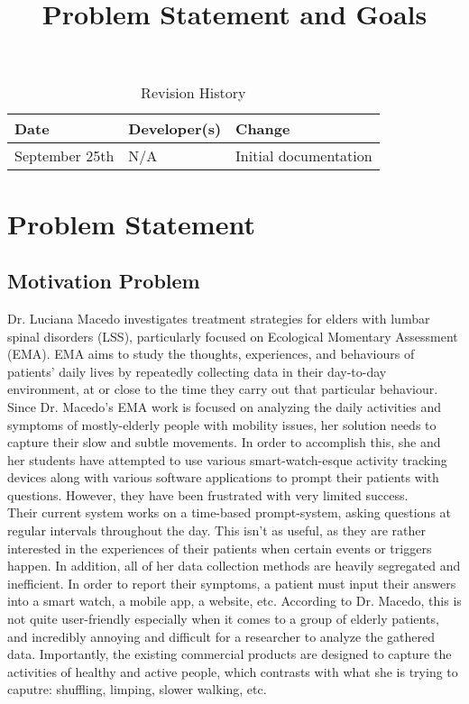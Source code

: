 \documentclass{article}
\title{Problem Statement and Goals\\\progname}
\author{\authname}
\date{}
\begin{document}
\maketitle

\begin{table}[hp]
    \caption{Revision History} \label{TblRevisionHistory}
    \begin{tabularx}{\textwidth}{llX}
        \toprule
        \textbf{Date}  & \textbf{Developer(s)} & \textbf{Change}       \\
        \midrule
        September 25th & N/A                   & Initial documentation \\
        \bottomrule
    \end{tabularx}
\end{table}

\newpage

\section{Problem Statement}

\subsection{Motivation Problem}

Dr. Luciana Macedo investigates treatment strategies for elders with  lumbar spinal disorders (LSS), particularly focused on Ecological Momentary Assessment (EMA). EMA aims to study the thoughts, experiences, and behaviours of patients' daily lives by repeatedly collecting data in their day-to-day environment, at or close to the time they carry out that particular behaviour.\\

Since Dr. Macedo's EMA work is focused on analyzing the daily activities and symptoms of mostly-elderly people with mobility issues, her solution needs to capture their slow and subtle movements. In order to accomplish this, she and her students have attempted to use various smart-watch-esque activity tracking devices along with various software applications to prompt their patients with questions. However, they have been frustrated with very limited success.\\

Their current system works on a time-based prompt-system, asking questions at regular intervals throughout the day. This isn't as useful, as they are rather interested in the experiences of their patients when certain events or triggers happen. In addition, all of her data collection methods are heavily segregated and inefficient. In order to report their symptoms, a patient must input their answers into a smart watch, a mobile app, a website, etc. According to Dr. Macedo, this is not quite user-friendly especially when it comes to a group of elderly patients, and incredibly annoying and difficult for a researcher to analyze the gathered data. Importantly, the existing commercial products are designed to capture the activities of healthy and active people, which contrasts with what she is trying to caputre: shuffling, limping, slower walking, etc.\\
\end{document}
